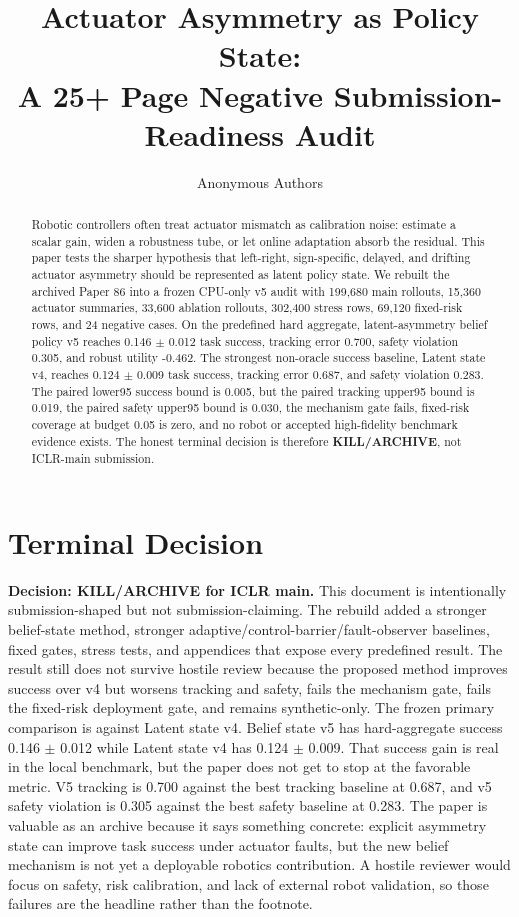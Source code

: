 \documentclass{article}
\title{Actuator Asymmetry as Policy State:\\A 25+ Page Negative Submission-Readiness Audit}
\author{Anonymous Authors}
\newcommand{\methodname}{latent-asymmetry belief policy v5}
\begin{document}
\maketitle
\begin{abstract}
Robotic controllers often treat actuator mismatch as calibration noise: estimate a scalar gain, widen a robustness tube, or let online adaptation absorb the residual. This paper tests the sharper hypothesis that left-right, sign-specific, delayed, and drifting actuator asymmetry should be represented as latent policy state. We rebuilt the archived Paper 86 into a frozen CPU-only v5 audit with 199,680 main rollouts, 15,360 actuator summaries, 33,600 ablation rollouts, 302,400 stress rows, 69,120 fixed-risk rows, and 24 negative cases. On the predefined hard aggregate, \methodname{} reaches 0.146 $\pm$ 0.012 task success, tracking error 0.700, safety violation 0.305, and robust utility -0.462. The strongest non-oracle success baseline, Latent state v4, reaches 0.124 $\pm$ 0.009 task success, tracking error 0.687, and safety violation 0.283. The paired lower95 success bound is 0.005, but the paired tracking upper95 bound is 0.019, the paired safety upper95 bound is 0.030, the mechanism gate fails, fixed-risk coverage at budget 0.05 is zero, and no robot or accepted high-fidelity benchmark evidence exists. The honest terminal decision is therefore \textbf{KILL/ARCHIVE}, not ICLR-main submission.
\end{abstract}
\section{Terminal Decision}
\textbf{Decision: KILL/ARCHIVE for ICLR main.} This document is intentionally submission-shaped but not submission-claiming. The rebuild added a stronger belief-state method, stronger adaptive/control-barrier/fault-observer baselines, fixed gates, stress tests, and appendices that expose every predefined result. The result still does not survive hostile review because the proposed method improves success over v4 but worsens tracking and safety, fails the mechanism gate, fails the fixed-risk deployment gate, and remains synthetic-only.
The frozen primary comparison is against Latent state v4. Belief state v5 has hard-aggregate success 0.146 $\pm$ 0.012 while Latent state v4 has 0.124 $\pm$ 0.009. That success gain is real in the local benchmark, but the paper does not get to stop at the favorable metric. V5 tracking is 0.700 against the best tracking baseline at 0.687, and v5 safety violation is 0.305 against the best safety baseline at 0.283.
The paper is valuable as an archive because it says something concrete: explicit asymmetry state can improve task success under actuator faults, but the new belief mechanism is not yet a deployable robotics contribution. A hostile reviewer would focus on safety, risk calibration, and lack of external robot validation, so those failures are the headline rather than the footnote.
\end{document}
